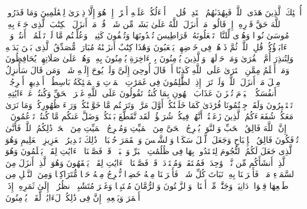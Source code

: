 أُو۟لَٰۤئِكَ ٱلَّذِینَ هَدَى ٱللَّهُۖ فَبِهُدَىٰهُمُ ٱقۡتَدِهۡۗ قُل لَّاۤ أَسۡءَلُكُمۡ عَلَیۡهِ أَجۡرًاۖ إِنۡ هُوَ إِلَّا ذِكۡرَىٰ لِلۡعَٰلَمِینَ%
\stopbuffer
\startbuffer[\q:6:91]
وَمَا قَدَرُوا۟ ٱللَّهَ حَقَّ قَدۡرِهِۦۤ إِذۡ قَالُوا۟ مَاۤ أَنزَلَ ٱللَّهُ عَلَىٰ بَشَرࣲ مِّن شَیۡءࣲۗ قُلۡ مَنۡ أَنزَلَ ٱلۡكِتَٰبَ ٱلَّذِی جَاۤءَ بِهِۦ مُوسَىٰ نُورࣰا وَهُدࣰى لِّلنَّاسِۖ تَجۡعَلُونَهُۥ قَرَاطِیسَ تُبۡدُونَهَا وَتُخۡفُونَ كَثِیرࣰاۖ وَعُلِّمۡتُم مَّا لَمۡ تَعۡلَمُوۤا۟ أَنتُمۡ وَلَاۤ ءَابَاۤؤُكُمۡۖ قُلِ ٱللَّهُۖ ثُمَّ ذَرۡهُمۡ فِی خَوۡضِهِمۡ یَلۡعَبُونَ%
\stopbuffer
\startbuffer[\q:6:92]
وَهَٰذَا كِتَٰبٌ أَنزَلۡنَٰهُ مُبَارَكࣱ مُّصَدِّقُ ٱلَّذِی بَیۡنَ یَدَیۡهِ وَلِتُنذِرَ أُمَّ ٱلۡقُرَىٰ وَمَنۡ حَوۡلَهَاۚ وَٱلَّذِینَ یُؤۡمِنُونَ بِٱلۡءَاخِرَةِ یُؤۡمِنُونَ بِهِۦۖ وَهُمۡ عَلَىٰ صَلَاتِهِمۡ یُحَافِظُونَ%
\stopbuffer
\startbuffer[\q:6:93]
وَمَنۡ أَظۡلَمُ مِمَّنِ ٱفۡتَرَىٰ عَلَى ٱللَّهِ كَذِبًا أَوۡ قَالَ أُوحِیَ إِلَیَّ وَلَمۡ یُوحَ إِلَیۡهِ شَیۡءࣱ وَمَن قَالَ سَأُنزِلُ مِثۡلَ مَاۤ أَنزَلَ ٱللَّهُۗ وَلَوۡ تَرَىٰۤ إِذِ ٱلظَّٰلِمُونَ فِی غَمَرَٰتِ ٱلۡمَوۡتِ وَٱلۡمَلَٰۤئِكَةُ بَاسِطُوۤا۟ أَیۡدِیهِمۡ أَخۡرِجُوۤا۟ أَنفُسَكُمُۖ ٱلۡیَوۡمَ تُجۡزَوۡنَ عَذَابَ ٱلۡهُونِ بِمَا كُنتُمۡ تَقُولُونَ عَلَى ٱللَّهِ غَیۡرَ ٱلۡحَقِّ وَكُنتُمۡ عَنۡ ءَایَٰتِهِۦ تَسۡتَكۡبِرُونَ%
\stopbuffer
\startbuffer[\q:6:94]
وَلَقَدۡ جِئۡتُمُونَا فُرَٰدَىٰ كَمَا خَلَقۡنَٰكُمۡ أَوَّلَ مَرَّةࣲ وَتَرَكۡتُم مَّا خَوَّلۡنَٰكُمۡ وَرَاۤءَ ظُهُورِكُمۡۖ وَمَا نَرَىٰ مَعَكُمۡ شُفَعَاۤءَكُمُ ٱلَّذِینَ زَعَمۡتُمۡ أَنَّهُمۡ فِیكُمۡ شُرَكَٰۤؤُا۟ۚ لَقَد تَّقَطَّعَ بَیۡنَكُمۡ وَضَلَّ عَنكُم مَّا كُنتُمۡ تَزۡعُمُونَ%
\stopbuffer
\startbuffer[\q:6:95]
۞ إِنَّ ٱللَّهَ فَالِقُ ٱلۡحَبِّ وَٱلنَّوَىٰۖ یُخۡرِجُ ٱلۡحَیَّ مِنَ ٱلۡمَیِّتِ وَمُخۡرِجُ ٱلۡمَیِّتِ مِنَ ٱلۡحَیِّۚ ذَٰلِكُمُ ٱللَّهُۖ فَأَنَّىٰ تُؤۡفَكُونَ%
\stopbuffer
\startbuffer[\q:6:96]
فَالِقُ ٱلۡإِصۡبَاحِ وَجَعَلَ ٱلَّیۡلَ سَكَنࣰا وَٱلشَّمۡسَ وَٱلۡقَمَرَ حُسۡبَانࣰاۚ ذَٰلِكَ تَقۡدِیرُ ٱلۡعَزِیزِ ٱلۡعَلِیمِ%
\stopbuffer
\startbuffer[\q:6:97]
وَهُوَ ٱلَّذِی جَعَلَ لَكُمُ ٱلنُّجُومَ لِتَهۡتَدُوا۟ بِهَا فِی ظُلُمَٰتِ ٱلۡبَرِّ وَٱلۡبَحۡرِۗ قَدۡ فَصَّلۡنَا ٱلۡءَایَٰتِ لِقَوۡمࣲ یَعۡلَمُونَ%
\stopbuffer
\startbuffer[\q:6:98]
وَهُوَ ٱلَّذِیۤ أَنشَأَكُم مِّن نَّفۡسࣲ وَٰحِدَةࣲ فَمُسۡتَقَرࣱّ وَمُسۡتَوۡدَعࣱۗ قَدۡ فَصَّلۡنَا ٱلۡءَایَٰتِ لِقَوۡمࣲ یَفۡقَهُونَ%
\stopbuffer
\startbuffer[\q:6:99]
وَهُوَ ٱلَّذِیۤ أَنزَلَ مِنَ ٱلسَّمَاۤءِ مَاۤءࣰ فَأَخۡرَجۡنَا بِهِۦ نَبَاتَ كُلِّ شَیۡءࣲ فَأَخۡرَجۡنَا مِنۡهُ خَضِرࣰا نُّخۡرِجُ مِنۡهُ حَبࣰّا مُّتَرَاكِبࣰا وَمِنَ ٱلنَّخۡلِ مِن طَلۡعِهَا قِنۡوَانࣱ دَانِیَةࣱ وَجَنَّٰتࣲ مِّنۡ أَعۡنَابࣲ وَٱلزَّیۡتُونَ وَٱلرُّمَّانَ مُشۡتَبِهࣰا وَغَیۡرَ مُتَشَٰبِهٍۗ ٱنظُرُوۤا۟ إِلَىٰ ثَمَرِهِۦۤ إِذَاۤ أَثۡمَرَ وَیَنۡعِهِۦۤۚ إِنَّ فِی ذَٰلِكُمۡ لَءَایَٰتࣲ لِّقَوۡمࣲ یُؤۡمِنُونَ%
